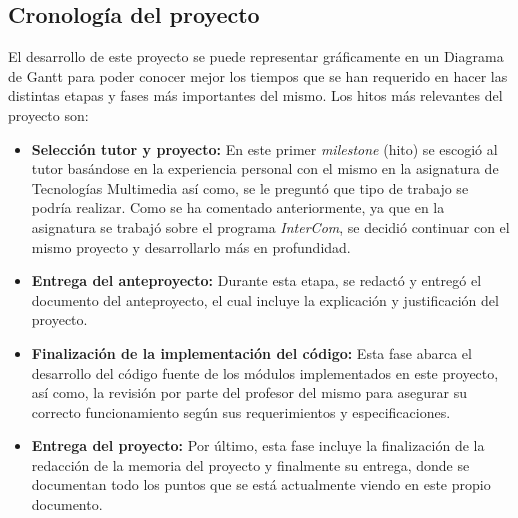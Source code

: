 \subsection{Cronología del proyecto}
El desarrollo de este proyecto se puede representar gráficamente en un Diagrama de Gantt para poder conocer mejor los tiempos que se han requerido en hacer las distintas etapas y fases más importantes del mismo. Los hitos más relevantes del proyecto son:
\begin{itemize}
    \item \textbf{Selección tutor y proyecto:} En este primer \textit{milestone} (hito) se escogió al tutor basándose en la experiencia personal con el mismo en la asignatura de Tecnologías Multimedia así como, se le preguntó que tipo de trabajo se podría realizar. Como se ha comentado anteriormente, ya que en la asignatura se trabajó sobre el programa \textit{InterCom}, se decidió continuar con el mismo proyecto y desarrollarlo más en profundidad.
    \item \textbf{Entrega del anteproyecto:} Durante esta etapa, se redactó y entregó el documento del anteproyecto, el cual incluye la explicación y justificación del proyecto. 
    \item \textbf{Finalización de la implementación del código:} Esta fase abarca el desarrollo del código fuente de los módulos implementados en este proyecto, así como, la revisión por parte del profesor del mismo para asegurar su correcto funcionamiento según sus requerimientos y especificaciones.
    \item \textbf{Entrega del proyecto:} Por último, esta fase incluye la finalización de la redacción de la memoria del proyecto y finalmente su entrega, donde se documentan todo los puntos que se está actualmente viendo en este propio documento.
\end{itemize}

\newpage

